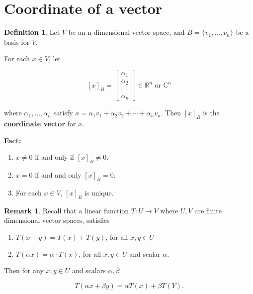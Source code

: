 \documentclass[12pt]{article}
\theoremstyle{definition}
\newtheorem*{definition}{Definition}
\newtheorem*{remark}{Remark}
\begin{document}
\section{Coordinate of a vector}

\begin{definition}
Let $V$ be an n-dimensional vector space, and $B = \{ v_1, \ldots, v_n \}$ be
a basis for $V$.

For each $x \in V$, let

\[ [x]_B =
\begin{bmatrix}
\alpha_1 \\
\alpha_2 \\
\vdots \\
\alpha_n
\end{bmatrix}
\in \mathbb{R}^n \text{ or } \mathbb{C}^n
\]

where $\alpha_1, \ldots, \alpha_n$ satisfy 
$x = \alpha_1 v_1 + \alpha_2 v_2 + \cdots + \alpha_n v_n$. Then $[x]_B$ is the
\textbf{coordinate vector} for $x$.
\end{definition}

\noindent \textbf{Fact:}

\begin{enumerate}[label = (\arabic*)]
\item $x \neq 0$ if and only if $[x]_B \neq 0$.

\item $x = 0$ if and and only $[x]_B = 0$.

\item For each $x \in V$, $[x]_B$ is unique.
\end{enumerate}


\begin{remark}
Recall that a linear function $T:U \rightarrow V$ where $U, V$ are finite
dimensional vector spaces, satisfies

\begin{enumerate}[label = (\arabic*)]
\item $T(x + y) = T(x) + T(y)$, for all $x, y \in U$

\item $T(\alpha x) = \alpha \cdot T(x)$, for all $x, y \in U$ and scalar $\alpha$.
\end{enumerate}

Then for any $x, y \in U$ and scalars $\alpha, \beta$

\[ T(\alpha x + \beta y) = \alpha T(x) + \beta T(Y). \]

\end{remark}
\end{document}
